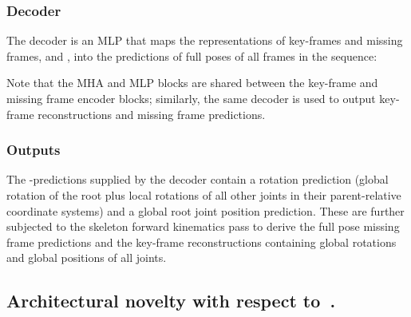 \documentclass[letterpaper]{article} \usepackage[]{aaai23}  \usepackage{times}  \usepackage{helvet}  \usepackage{courier}  \usepackage[hyphens]{url}  \usepackage{graphicx} \urlstyle{rm} \def\UrlFont{\rm}  \usepackage{natbib}  \usepackage{caption} \frenchspacing  \setlength{\pdfpagewidth}{8.5in} \setlength{\pdfpageheight}{11in}
\begin{document}
\subsubsection{Decoder} 
The decoder is an MLP that maps the representations of key-frames and missing frames,  and , into the predictions of full poses of all frames in the sequence:


Note that the MHA and MLP blocks are shared between the key-frame and missing frame encoder blocks; similarly, the same decoder is used to output key-frame reconstructions and missing frame predictions.

\subsubsection{Outputs} 
The -predictions  supplied by the decoder contain a  rotation prediction (global rotation of the root plus local rotations of all other joints in their parent-relative coordinate systems) and a  global root joint position prediction. These are further subjected to the skeleton forward kinematics pass to derive the full pose missing frame predictions  and the key-frame reconstructions  containing   global rotations and  global positions of all joints.


\subsection{Architectural novelty with respect to~\cite{duan2021singleshot}.} \label{ssec:architectural_novelty}
\end{document}
